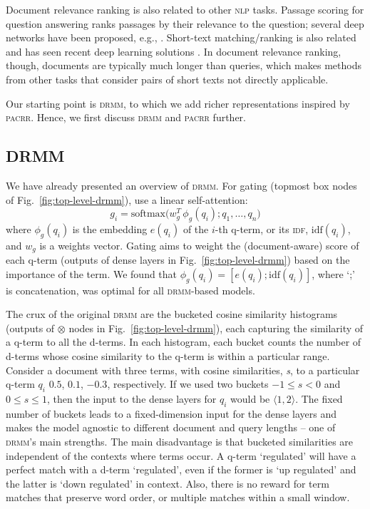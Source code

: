 \documentclass[11pt,a4paper]{article}
\newcommand{\nlp}{\textsc{nlp}\xspace}
\newcommand{\drmm}{\textsc{drmm}\xspace}
\newcommand{\pacrr}{\textsc{pacrr}\xspace}
\newcommand{\idf}{\textsc{idf}\xspace}
\begin{document}
Document relevance ranking is also related to other \nlp tasks. Passage scoring for question answering \cite{surdeanu2008learning} ranks passages 
by their relevance to the question; several deep networks have been proposed, e.g., .
Short-text matching/ranking is also related and has seen recent deep learning solutions \cite{lu2013deep,hu2014convolutional,severyn2015learning}.
In document relevance ranking, though, documents are typically much longer than queries, which makes methods from other tasks that consider pairs of short texts not directly applicable.

Our starting point is \drmm, to which we add richer representations inspired by \pacrr. Hence, we first discuss \drmm and \pacrr further. 



\subsection{DRMM}
\label{sec:drmm}

We have already presented an overview of \drmm. For gating (topmost box nodes of Fig.~\ref{fig:top-level-drmm}),  use a linear self-attention:
\[g_i = \textrm{softmax}\Big(w_g^T \, \phi_g(q_i); q_1, \dots, q_n\Big)\]
where $\phi_g(q_i)$ is the embedding $e(q_i)$ of the $i$-th q-term, 
or its \idf, $\textrm{idf}(q_i)$, and $w_g$ is a weights vector. Gating aims to weight the (document-aware) score of each q-term
(outputs of dense layers in Fig.~\ref{fig:top-level-drmm}) based on the importance of the term. We found that   
$\phi_g(q_i) = [e(q_i); \textrm{idf}(q_i)]$, where `;' is concatenation, was optimal for all \drmm-based models.

The crux of the original \drmm are the bucketed cosine similarity histograms (outputs of $\otimes$ nodes in Fig.~\ref{fig:top-level-drmm}), each capturing the similarity of a 
q-term to all the d-terms. In each histogram, each bucket counts the number of d-terms whose cosine similarity to the q-term is within a particular range. Consider a document with three terms, with cosine similarities, \textit{s}, to a particular q-term $q_i$ $0.5$, $0.1$, $-0.3$, respectively. If we used two buckets 
$-1 \leq s < 0$ and $0 \leq s \leq 1$,
then the input to the dense layers for $q_i$ would be $\langle 1, 2 \rangle$.
The fixed number of buckets leads to a fixed-dimension input for the dense layers and makes the model agnostic to different document and query lengths -- one of \drmm's main strengths.
The main disadvantage is that bucketed similarities are independent of the contexts where terms occur. 
A q-term `regulated' will have a perfect match with a d-term `regulated', even if the former is `up regulated' and the latter is `down regulated' in context. 
Also, there is no reward for term matches that preserve word order, or multiple matches within a small window.
\end{document}
